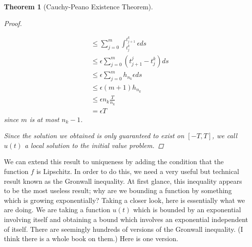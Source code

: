 \documentclass[10pt]{article}         %
\newtheorem{theorem}{Theorem}[section]
\theoremstyle{remark}
\begin{document}
\begin{theorem}[Cauchy-Peano Existence Theorem]
\begin{proof}
\begin{enumerate}
\begin{align*}
    &\leq \sum_{j=0}^{m} \int_{t_j^k}^{t_{j+1}^k} \epsilon ds \\
    &\leq \epsilon \sum_{j=0}^m (t_{j+1}^j - t_j^k) ds \\
    &\leq \epsilon \sum_{j=0}^m h_{n_k} \epsilon ds \\
    &\leq \epsilon (m+1) h_{n_k} \\
    &\leq \epsilon n_k \frac{T}{n_k} \\
    &= \epsilon T
    \end{align*}
    since $m$ is at most $n_k - 1$.
\end{enumerate}
Since the solution we obtained is only guaranteed to exist on $[-T, T]$, we call $u(t)$ a local solution to the initial value problem.
\end{proof}
\end{theorem}


We can extend this result to uniqueness by adding the condition that the function $f$ is Lipschitz. In order to do this, we need a very useful but technical result known as the Gronwall inequality. At first glance, this inequality appears to be the most useless result; why are we bounding a function by something which is growing exponentially? Taking a closer look, here is essentially what we are doing. We are taking a function $u(t)$ which is bounded by an exponential involving itself and obtaining a bound which involves an exponential independent of itself. There are seemingly hundreds of versions of the Gronwall inequality. (I think there is a whole book on them.) Here is one version.
\end{document}
